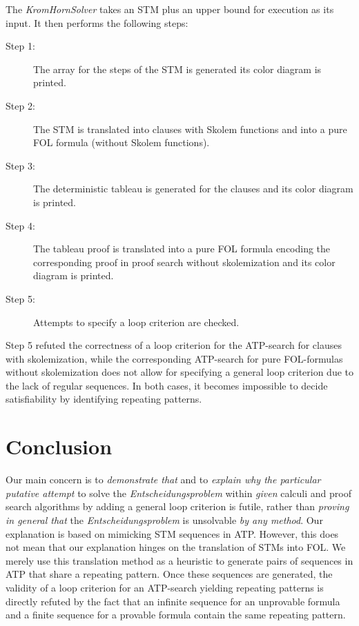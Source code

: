 \documentclass[%
  manuscript=article,   %
  year=2024,
  volume=77,
  doi=00000.000,
]{zfn}
\begin{document}
The \emph{KromHornSolver} takes an STM plus an upper bound for execution as its input. It then performs the following steps:
\begin{description}
\item[Step 1:] The array for the steps of the STM is generated its color diagram is printed.
\item[Step 2:] The STM is translated into clauses with Skolem functions and into a pure FOL formula (without Skolem functions).
\item[Step 3:] The deterministic tableau is generated for the clauses and its color diagram is printed.
\item[Step 4:] The tableau proof is translated into a pure FOL formula encoding the corresponding proof in proof search without skolemization and its color diagram is printed.
\item[Step 5:] Attempts to specify a loop criterion are checked.
\end{description}

Step 5 refuted the correctness of a loop criterion for the ATP-search for clauses with skolemization, while the corresponding ATP-search for pure FOL-formulas without skolemization does not allow for specifying a general loop criterion due to the lack of regular sequences. In both cases, it becomes impossible to decide satisfiability by identifying repeating patterns.

\section{Conclusion}\label{discussion}

Our main concern is to \emph{demonstrate that} and to \emph{explain why the particular putative attempt} to solve the \emph{Entscheidungsproblem} within \emph{given} calculi and proof search algorithms by adding a general loop criterion is futile, rather than \emph{proving in general that} the \emph{Entscheidungsproblem} is unsolvable \emph{by any method}. Our explanation is based on mimicking STM sequences in ATP. However, this does not mean that our explanation hinges on the translation of STMs into FOL. We merely use this translation method as a heuristic to generate pairs of sequences in ATP that share a repeating pattern. Once these sequences are generated, the validity of a loop criterion for an ATP-search yielding repeating patterns is directly refuted by the fact that an infinite sequence for an unprovable formula and a finite sequence for a provable formula contain the same repeating pattern.
\end{document}

